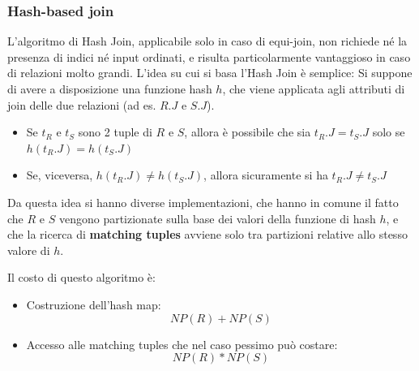 \documentclass[a4paper]{article}
\begin{document}
\subsubsection*{Hash-based join}
L'algoritmo di Hash Join, applicabile solo in caso di equi-join, non richiede né la
presenza di indici né input ordinati, e risulta particolarmente vantaggioso in caso
di relazioni molto grandi. L'idea su cui si basa l'Hash Join è semplice:
Si suppone di avere a disposizione una funzione hash \( h \), che viene applicata agli
attributi di join delle due relazioni (ad es. \( R.J \) e \( S.J \)).
\begin{itemize}
  \item Se \( t_R \) e \( t_S \) sono 2 tuple di \( R \) e \( S \), allora è possibile
    che sia \( t_R.J = t_S.J \) solo se \( h(t_R.J) = h(t_S.J) \)

  \item Se, viceversa, \( h(t_R.J) \neq h(t_S.J) \), allora sicuramente si ha
    \( t_R.J \neq t_S.J \)
\end{itemize}
Da questa idea si hanno diverse implementazioni, che hanno in comune il fatto
che \( R \) e \( S \) vengono partizionate sulla base dei valori della funzione di
hash \( h \), e che la ricerca di \textbf{matching tuples} avviene solo tra
partizioni relative allo stesso valore di \( h \).

\vspace{1em}
\noindent
Il costo di questo algoritmo è:
\begin{itemize}
  \item Costruzione dell'hash map:
    \[
      NP(R) + NP(S)
    \] 

  \item Accesso alle matching tuples che nel caso pessimo può costare:
    \[
      NP(R) * NP(S)
    \] 
\end{itemize}
\end{document}
